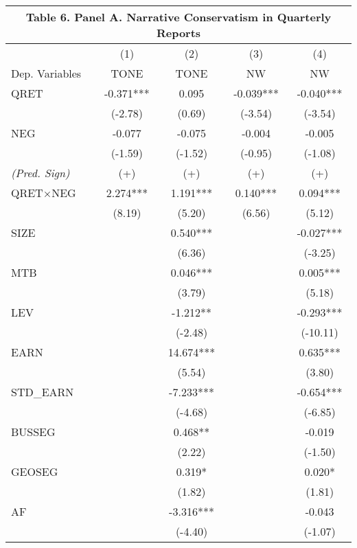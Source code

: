 \begin{table}[H]	\label{T6PA}%
	\begin{center}
		\begin{tabular}{lcccc}
			\multicolumn{5}{c}{\textbf{Table 6. Panel A. Narrative Conservatism in Quarterly Reports}} \\
			\midrule
			\midrule
			& (1) & (2) & (3) & (4) \\
			Dep. Variables & TONE & TONE & NW & NW \\
			\midrule
			QRET & -0.371*** & 0.095 & -0.039*** & -0.040*** \\
			& (-2.78) & (0.69) & (-3.54) & (-3.54) \\
			NEG & -0.077 & -0.075 & -0.004 & -0.005 \\
			& (-1.59) & (-1.52) & (-0.95) & (-1.08) \\
			\rowcolor[rgb]{ .906,  .902,  .902} \textit{(Pred. Sign)} & (+) & (+) & (+) & (+) \\
			\rowcolor[rgb]{ .906,  .902,  .902} QRET$\times$NEG & 2.274*** & 1.191*** & 0.140*** & 0.094*** \\
			\rowcolor[rgb]{ .906,  .902,  .902} & (8.19) & (5.20) & (6.56) & (5.12) \\
			SIZE &   & 0.540*** &   & -0.027*** \\
			&   & (6.36) &   & (-3.25) \\
			MTB &   & 0.046*** &   & 0.005*** \\
			&   & (3.79) &   & (5.18) \\
			LEV &   & -1.212** &   & -0.293*** \\
			&   & (-2.48) &   & (-10.11) \\
			EARN &   & 14.674*** &   & 0.635*** \\
			&   & (5.54) &   & (3.80) \\
			STD\_EARN &   & -7.233*** &   & -0.654*** \\
			&   & (-4.68) &   & (-6.85) \\
			BUSSEG &   & 0.468** &   & -0.019 \\
			&   & (2.22) &   & (-1.50) \\
			GEOSEG &   & 0.319* &   & 0.020* \\
			&   & (1.82) &   & (1.81) \\
			AF &   & -3.316*** &   & -0.043 \\
			&   & (-4.40) &   & (-1.07) \\

\end{tabular}
\end{center}
\end{table}
